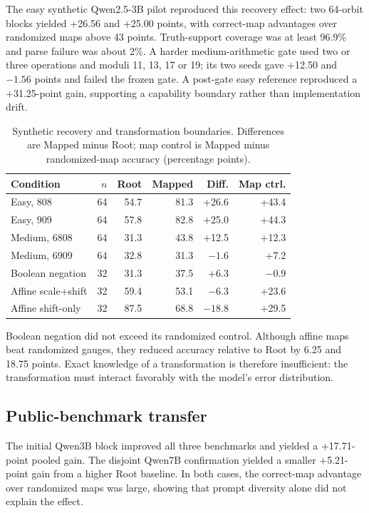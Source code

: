\documentclass{article}
\begin{document}
The easy synthetic Qwen2.5-3B pilot reproduced this recovery effect: two 64-orbit blocks yielded +26.56 and +25.00 points, with correct-map advantages over randomized maps above 43 points. Truth-support coverage was at least 96.9\% and parse failure was about 2\%. A harder medium-arithmetic gate used two or three operations and moduli 11, 13, 17 or 19; its two seeds gave +12.50 and $-1.56$ points and failed the frozen gate. A post-gate easy reference reproduced a +31.25-point gain, supporting a capability boundary rather than implementation drift.

\begin{table}[t]
\centering\small\setlength{\tabcolsep}{2.2pt}
\caption{Synthetic recovery and transformation boundaries. Differences are Mapped minus Root; map control is Mapped minus randomized-map accuracy (percentage points).}
\label{tab:synthetic}
\begin{tabular}{@{}lrrrrr@{}}
\toprule
Condition & $n$ & Root & Mapped & Diff. & Map ctrl.\\
\midrule
Easy, 808 & 64 & 54.7 & 81.3 & +26.6 & +43.4\\
Easy, 909 & 64 & 57.8 & 82.8 & +25.0 & +44.3\\
Medium, 6808 & 64 & 31.3 & 43.8 & +12.5 & +12.3\\
Medium, 6909 & 64 & 32.8 & 31.3 & $-1.6$ & +7.2\\
Boolean negation & 32 & 31.3 & 37.5 & +6.3 & $-0.9$\\
Affine scale+shift & 32 & 59.4 & 53.1 & $-6.3$ & +23.6\\
Affine shift-only & 32 & 87.5 & 68.8 & $-18.8$ & +29.5\\
\bottomrule
\end{tabular}
\end{table}

Boolean negation did not exceed its randomized control. Although affine maps beat randomized gauges, they reduced accuracy relative to Root by 6.25 and 18.75 points. Exact knowledge of a transformation is therefore insufficient: the transformation must interact favorably with the model's error distribution.

\subsection{Public-benchmark transfer}
The initial Qwen3B block improved all three benchmarks and yielded a +17.71-point pooled gain. The disjoint Qwen7B confirmation yielded a smaller +5.21-point gain from a higher Root baseline. In both cases, the correct-map advantage over randomized maps was large, showing that prompt diversity alone did not explain the effect.
\end{document}
